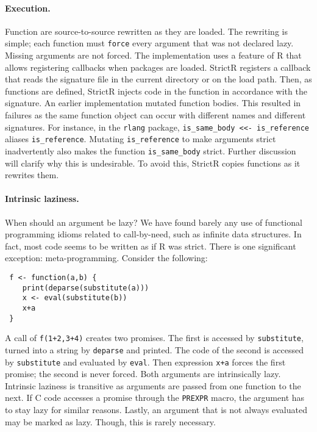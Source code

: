 \documentclass[review,creen,acmsmall]{acmart}
\renewcommand{\c}[1]{\lstinline |#1|\xspace}
\newcommand{\strictr}{{\sf StrictR}\xspace}
\begin{document}
\paragraph{Execution.}
Function are source-to-source rewritten as they are loaded. The rewriting is
simple; each function must \c{force} every argument that was not declared lazy.
Missing arguments are not forced. The implementation uses a feature of R that
allows registering callbacks when packages are loaded. \strictr registers a
callback that reads the signature file in the current directory or on the load
path. Then, as functions are defined, \strictr injects code in the function in
accordance with the signature. An earlier implementation mutated function
bodies. This resulted in failures as the same function object can occur with
different names and different signatures. For instance, in the \c{rlang}
package, \c{is_same_body <<- is_reference} aliases \c{is_reference}.
Mutating \c{is_reference} to make arguments strict inadvertently also makes
the function \c{is_same_body} strict. Further discussion will clarify why
this is undesirable. To avoid this, \strictr copies functions as it rewrites
them.

\paragraph{Intrinsic laziness.} When should an  argument be lazy?
We have found barely any use of functional programming idioms related to
call-by-need, such as infinite data structures. In fact, most code seems to be
written as if R was strict. There is one significant exception:
meta-programming. Consider the following:
\begin{lstlisting}
 f <- function(a,b) {
    print(deparse(substitute(a)))
    x <- eval(substitute(b))
    x+a
 }
\end{lstlisting}

\medskip

A call of \c{f(1+2,3+4)} creates two promises. The first is accessed by
\c{substitute}, turned into a string by \c{deparse} and printed. The code of the
second is accessed by \c{substitute} and evaluated by \c{eval}. Then expression
\c{x+a} forces the first promise; the second is never forced. Both arguments are
intrinsically lazy. Intrinsic laziness is transitive as arguments are passed
from one function to the next. If C code accesses a promise through the
\c{PREXPR} macro, the argument has to stay lazy for similar reasons. Lastly,
an argument that is not always evaluated may be marked as lazy. Though, this
is rarely necessary.
\end{document}
